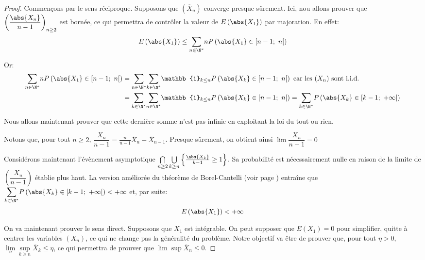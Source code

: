 \begin{proof}
Commençons par le sens réciproque. Supposons que $\left ( \overline{X}_n\right )$ converge presque sûrement. Ici, nou allons prouver que $\left (\dfrac{\abs{X_n}}{n-1}\right )_{n \geq 2}$ est bornée, ce qui permettra de contrôler la valeur de $E\left ( \abs{X_1} \right )$ par majoration. En effet:
\[
E\left ( \abs{X_1}\right ) \leq \displaystyle{\sum \limits_{n \in \N^*}} n P \left ( \abs{X_1} \in [n-1;~n[ \right ) 
\]

Or:
\begin{align*}
\displaystyle{\sum \limits_{n \in \N^*}} n P \left ( \abs{X_1} \in [n-1;~n[ \right )  & = \displaystyle{\sum \limits_{n \in \N^*}} \displaystyle{\sum \limits_{k \in \N^*}} \mathbb{1}_{k \leq n} P \left ( \abs{X_k} \in [n-1;~n[ \right ) \text{ car les $(X_n)$ sont i.i.d.} \\
 & = \displaystyle{\sum \limits_{k \in \N^*}} \displaystyle{\sum \limits_{n \in \N^*}} \mathbb{1}_{k \leq n} P \left ( \abs{X_k} \in [n-1;~n[ \right ) = \displaystyle{\sum \limits_{k \in \N^*}} P \left ( \abs{X_k} \in [k-1;~+\infty[ \right )
\end{align*}

Nous allons maintenant prouver que cette dernière somme n'est pas infinie en exploitant la loi du tout ou rien.

\medskip
Notons que, pour tout $n \geq 2$, $\dfrac{X_n}{n-1} = \frac{n}{n-1} \overline{X}_n - \overline{X}_{n-1}$. Presque sûrement, on obtient ainsi $\lim \dfrac{X_n}{n-1} = 0$

\medskip
Considérons maintenant l'évènement asymptotique $\bigcap \limits_{n \geq 2} \bigcup \limits_{k \geq n} \left \{ \frac{\abs{X_k}}{k-1} \geq 1 \right \}$. Sa probabilité est nécessairement nulle en raison de la limite de $\left (\dfrac{X_n}{n-1}\right )$ établie plus haut. La version améliorée du théorème de Borel-Cantelli (voir page  \pageref{borel_cantelli_fort}) entraîne que $\displaystyle{\sum \limits_{k \in \N^*}} P \left ( \abs{X_k} \in [k-1;~+\infty[ \right ) < +\infty$ et, par suite:
\[
E\left ( \abs{X_1}\right ) < +\infty
\]

\medskip
On va maintenant prouver le sens direct. Supposons que $X_1$ est intégrable. On peut supposer que $E(X_1) = 0$ pour simplifier, quitte à centrer les variables $(X_n)$, ce qui ne change pas la généralité du problème. Notre objectif va être de prouver que, pour tout $\eta >0$, $\lim \limits_n \sup \limits_{k \geq n} \overline{X}_k \leq \eta$, ce qui permettra de prouver que $\lim \sup \overline{X}_n \leq 0$. 


\end{proof}
